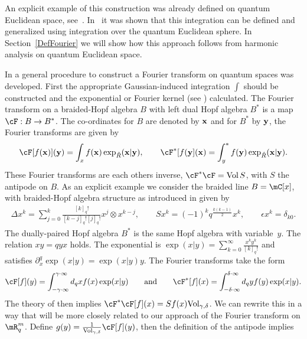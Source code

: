 An explicit example of this construction was already def\/ined on quantum Euclidean space, see~\cite{MR1239953}. In~\cite{MR1408120} it was shown that this integration can be def\/ined and generalized using integration over the quantum Euclidean sphere. In Section~\ref{DefFourier} we will show how this approach follows from harmonic analysis on quantum Euclidean space.


In \cite{MR1303081} a general procedure to construct a Fourier transform on quantum spaces was developed. First the appropriate Gaussian-induced integration $\int$ should be constructed and the exponential or Fourier kernel (see \cite{MR1235979, MR2099760}) calculated. The Fourier transform on a braided-Hopf algebra $B$ with left dual Hopf algebra $B^\ast$  is a map $\cF:B\to B^\ast$. The co-ordinates for $B$ are denoted by $\bold{x}$ and for $B^\ast$ by $\bold{y}$, the Fourier transforms are given by
\begin{gather*}
\cF[f(\bold{x})](\bold{y})=\int_x f(\bold{x})\exp_{\hat{R}}(\bold{x}|\bold{y}), \qquad \cF^\ast[f(\bold{y}](\bold{x})=\int^\ast_y f(\bold{y})\exp_{\hat{R}}(\bold{x}|\bold{y}).
\end{gather*}
These Fourier transforms are each others inverse, $\cF^\ast\cF=\mbox{Vol}\, S$, with $S$ the antipode on $B$. As an explicit example we consider the braided line $B=\mC[x]$, with braided-Hopf algebra structure as introduced in \cite{MR1182915} given by
\begin{gather*}
\Delta x^k=\sum_{j=0}^k\frac{[k]_q!}{[k-j]_q![j]_q!}x^j\otimes x^{k-j},\qquad Sx^k=(-1)^kq^{\frac{k(k-1)}{2}}x^k,\qquad\epsilon x^k=\delta_{k0}.
\end{gather*}
The dually-paired Hopf algebra $B^\ast$ is the same Hopf algebra with variable~$y$. The relation $xy=qyx$ holds. The exponential is $\exp(x|y)=\sum\limits_{k=0}^\infty\frac{x^ky^k}{[k]_q!}$ and satisf\/ies $\partial_x^q\exp(x|y)=\exp(x|y)y$. The Fourier transforms take the form
\begin{gather}
\label{Fourline}
\cF[f](y)=\int_{-\gamma\cdot\infty}^{\gamma\cdot\infty}d_qxf(x)\exp(x|y) \qquad \mbox{and}\qquad \cF^\ast[f](x)=\int_{-\delta\cdot\infty}^{\delta\cdot\infty}d_qyf(y)\exp(x|y).
\end{gather}
The theory of \cite{MR1303081} then implies $\cF^\ast\cF[f](x)=Sf(x)\mbox{Vol}_{\gamma,\delta}$. We can rewrite this in a way that will be more closely related to our approach of the Fourier transform on $\mR^m_q$. Def\/ine $g(y)=\frac{1}{{\rm Vol}_{\gamma,\delta}}\cF[f](y)$, then the def\/inition of the antipode implies
